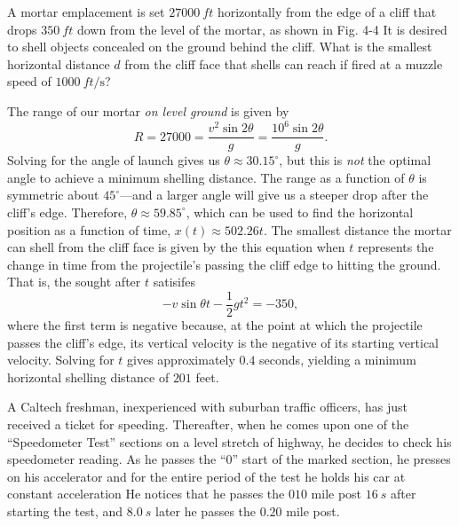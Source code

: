\documentclass[../feynman-lectures-on-physics.tex]{subfiles}
\begin{document}
\begin{questions}
	\question A mortar emplacement is set $\SI{27000}{ft}$ horizontally from the edge of a cliff that drops $\SI{350}{ft}$ down from the level of the mortar, as shown in Fig. 4-4 It is desired to shell objects concealed on the ground behind the cliff. What is the smallest horizontal distance $d$ from the cliff face that shells can reach if fired at a muzzle speed of $\SI{1000}{ft\per\second}$?
    
    \begin{solution}
      The range of our mortar \textit{on level ground} is given by
      \[
        R = 27000 = \frac{v^2\sin2\theta}{g} = \frac{10^6\sin2\theta}{g}.
      \]
      Solving for the angle of launch gives us $\theta \approx 30.15^\circ$, but
      this is \textit{not} the optimal angle to achieve a minimum shelling
      distance. The range as a function of $\theta$ is symmetric about
      $45^\circ$---and a larger angle will give us a steeper drop after the
      cliff's edge. Therefore, $\theta \approx 59.85^\circ$,
      which can be used to find the horizontal position as a function of time,
      $x(t) \approx 502.26t$. The smallest distance the mortar can shell
      from the cliff face is given by the this equation when $t$ represents the
      change in time from the projectile's passing the cliff edge to hitting the
      ground. That is, the sought after $t$ satisifes
      \[
        -v\sin\theta{t} - \frac{1}{2}gt^2 = -350,
      \]
      where the first term is negative because, at the point at which the
      projectile passes the cliff's edge, its vertical velocity is the negative
      of its starting vertical velocity. Solving for $t$ gives approximately
      $0.4$ seconds, yielding a minimum horizontal shelling distance of $201$ feet.
    \end{solution}

	\question A Caltech freshman, inexperienced with suburban traffic officers, has just received a ticket for speeding. Thereafter, when he comes upon one of the ``Speedometer Test'' sections on a level stretch of highway, he decides to check his speedometer reading. As he passes the ``0'' start of the marked section, he presses on his accelerator and for the entire period of the test he holds his car at constant acceleration He notices that he passes the $010$ mile post $\SI{16}{s}$ after starting the test, and $\SI{8.0}{s}$ later he passes the $0.20$ mile post.
\end{questions}
\end{document}
